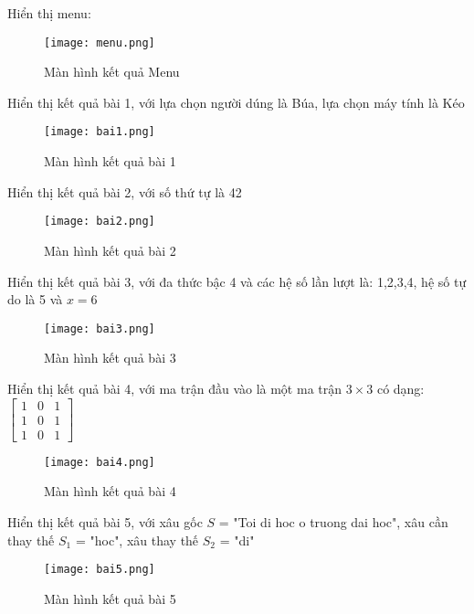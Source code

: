 \documentclass[a4paper]{article}
\begin{document}
Hiển thị menu:
    \begin{figure}[!h]
        \centering
        \texttt{[image: menu.png]}
        \caption{Màn hình kết quả Menu}
    \end{figure}

Hiển thị kết quả bài 1, với lựa chọn người dúng là Búa, lựa chọn máy tính là Kéo
        \begin{figure}[!h]
        \centering
        \texttt{[image: bai1.png]}
        \caption{Màn hình kết quả bài 1}
    \end{figure}

Hiển thị kết quả bài 2, với số thứ tự là 42
        \begin{figure}[!h]
        \centering
        \texttt{[image: bai2.png]}
        \caption{Màn hình kết quả bài 2}
    \end{figure}

Hiển thị kết quả bài 3, với đa thức bậc 4 và các hệ số lần lượt là: 1,2,3,4, hệ số tự do là 5 và $x=6$
        \begin{figure}[!h]
        \centering
        \texttt{[image: bai3.png]}
        \caption{Màn hình kết quả bài 3}
    \end{figure}
    
\pagebreak
Hiển thị kết quả bài 4, với ma trận đầu vào là một ma trận $3 \times 3$ có dạng:
$ \begin{bmatrix}
1 & 0 & 1 \\
1 & 0 & 1 \\
1 & 0 & 1 
\end{bmatrix}  $

        \begin{figure}[!h]
        \centering
        \texttt{[image: bai4.png]}
        \caption{Màn hình kết quả bài 4}
    \end{figure}

Hiển thị kết quả bài 5, với xâu gốc $S$ = "Toi di hoc o truong dai hoc", xâu cần thay thế $S_1$ = "hoc", xâu thay thế $S_2$ = "di"
        \begin{figure}[!h]
        \centering
        \texttt{[image: bai5.png]}
        \caption{Màn hình kết quả bài 5}
    \end{figure}
\end{document}
